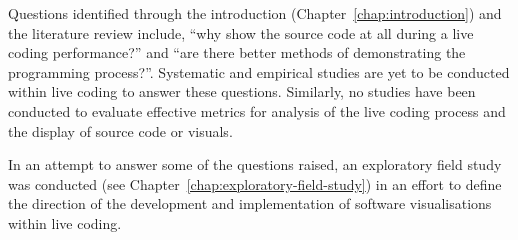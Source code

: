 Questions identified through the introduction (Chapter~\ref{chap:introduction}) and the literature review include, ``why show the source code at all during a live coding performance?'' and ``are there better methods of demonstrating the programming process?''. Systematic and empirical studies are yet to be conducted within live coding to answer these questions. Similarly, no studies have been conducted to evaluate effective metrics for analysis of the live coding process and the display of source code or visuals.

In an attempt to answer some of the questions raised, an exploratory field study was conducted (see Chapter~\ref{chap:exploratory-field-study}) in an effort to define the direction of the development and implementation of software visualisations within live coding.


